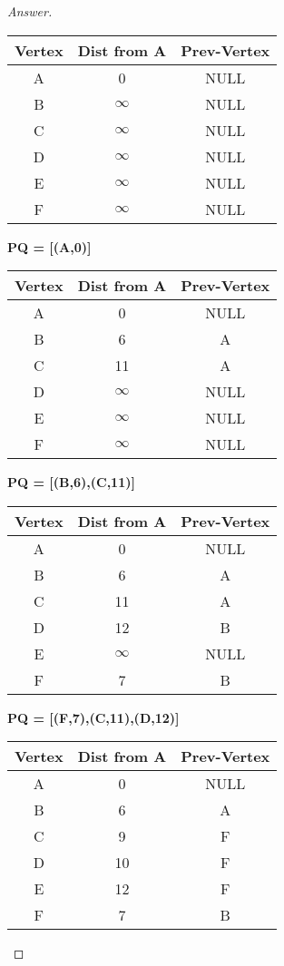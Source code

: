 \documentclass[11pt]{article}
\theoremstyle{definition}
\theoremstyle{definition}
\theoremstyle{definition}
\begin{document}
\begin{proof}[Answer]
\begin{center}
\begin{tabular}[c]{|c|c|c|} 
	Vertex &Dist from A &Prev-Vertex \\\hline
	A &0 & NULL\\
	B &$\infty$ & NULL\\
	C &$\infty$ & NULL\\
	D &$\infty$ & NULL\\
	E &$\infty$ & NULL\\
	F &$\infty$ & NULL\\
\end{tabular}
\end{center}	
\textbf{PQ = [(A,0)]}

\begin{center}
\begin{tabular}[c]{|c|c|c|} 
	Vertex &Dist from A &Prev-Vertex \\\hline
	A &0 & NULL\\
	B &6 & A\\
	C &11& A\\
	D &$\infty$ & NULL\\
	E &$\infty$ & NULL\\
	F &$\infty$ & NULL\\
\end{tabular}
\end{center}	
\textbf{PQ = [(B,6),(C,11)]}

\begin{center}
\begin{tabular}[c]{|c|c|c|} 
	Vertex &Dist from A &Prev-Vertex \\\hline
	A &0 & NULL\\
	B &6 & A\\
	C &11& A\\
	D &12 & B\\
	E &$\infty$ & NULL\\
	F &7 & B\\
\end{tabular}
\end{center}	

\textbf{PQ = [(F,7),(C,11),(D,12)]}

\begin{center}
\begin{tabular}[c]{|c|c|c|} 
	Vertex &Dist from A &Prev-Vertex \\\hline
	A &0 & NULL\\
	B &6 & A\\
	C &9& F\\
	D &10 & F\\
	E &12 & F\\
	F &7 & B\\
\end{tabular}
\end{center}	


\end{proof}
\end{document}
